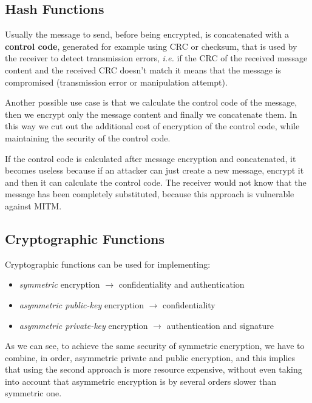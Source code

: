 \documentclass[oneside]{academica}
\begin{document}
\subsection{Hash Functions}

Usually the message to send, before being encrypted, is concatenated with a \textbf{control code}, generated for example using CRC or checksum, that is used by the receiver to detect transmission errors, \textit{i.e.} if the CRC of the received message content and the received CRC doesn't match it means that the message is compromised (transmission error or manipulation attempt).

Another possible use case is that we calculate the control code of the message, then we encrypt only the message content and finally we concatenate them.
In this way we cut out the additional cost of encryption of the control code, while maintaining the security of the control code.

\begin{note}
  If the control code is calculated after message encryption and concatenated, it becomes useless because if an attacker can just create a new message, encrypt it and then it can calculate the control code.
  The receiver would not know that the message has been completely substituted, because this approach is vulnerable against MITM.
\end{note}

\subsection{Cryptographic Functions}

Cryptographic functions can be used for implementing:
\begin{itemize}
  \item \textit{symmetric} encryption $\rightarrow$ confidentiality and authentication
  \item \textit{asymmetric public-key} encryption $\rightarrow$ confidentiality
  \item \textit{asymmetric private-key} encryption $\rightarrow$ authentication and signature
\end{itemize}
As we can see, to achieve the same security of symmetric encryption, we have to combine, in order, asymmetric private and public encryption, and this implies that using the second approach is more resource expensive, without even taking into account that asymmetric encryption is by several orders slower than symmetric one.
\end{document}
